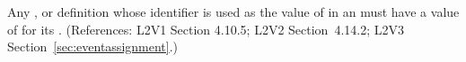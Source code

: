 Any \Compartment, \Species or \Parameter definition whose identifier is
used as the value of  in an \EventAssignment must have a
value of  for its  .  (References: 
L2V1 Section 4.10.5; L2V2 Section~4.14.2; L2V3 Section~\ref{sec:eventassignment}.)
